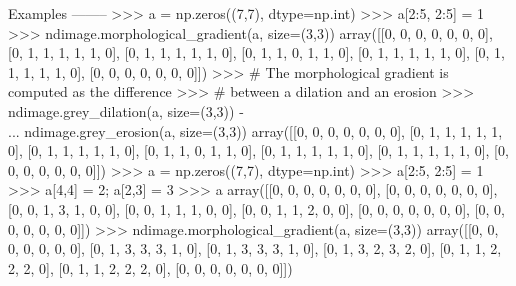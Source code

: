 \begin{DoxyVerb}
Examples
--------
>>> a = np.zeros((7,7), dtype=np.int)
>>> a[2:5, 2:5] = 1
>>> ndimage.morphological_gradient(a, size=(3,3))
array([[0, 0, 0, 0, 0, 0, 0],
       [0, 1, 1, 1, 1, 1, 0],
       [0, 1, 1, 1, 1, 1, 0],
       [0, 1, 1, 0, 1, 1, 0],
       [0, 1, 1, 1, 1, 1, 0],
       [0, 1, 1, 1, 1, 1, 0],
       [0, 0, 0, 0, 0, 0, 0]])
>>> # The morphological gradient is computed as the difference
>>> # between a dilation and an erosion
>>> ndimage.grey_dilation(a, size=(3,3)) -\\
...  ndimage.grey_erosion(a, size=(3,3))
array([[0, 0, 0, 0, 0, 0, 0],
       [0, 1, 1, 1, 1, 1, 0],
       [0, 1, 1, 1, 1, 1, 0],
       [0, 1, 1, 0, 1, 1, 0],
       [0, 1, 1, 1, 1, 1, 0],
       [0, 1, 1, 1, 1, 1, 0],
       [0, 0, 0, 0, 0, 0, 0]])
>>> a = np.zeros((7,7), dtype=np.int)
>>> a[2:5, 2:5] = 1
>>> a[4,4] = 2; a[2,3] = 3
>>> a
array([[0, 0, 0, 0, 0, 0, 0],
       [0, 0, 0, 0, 0, 0, 0],
       [0, 0, 1, 3, 1, 0, 0],
       [0, 0, 1, 1, 1, 0, 0],
       [0, 0, 1, 1, 2, 0, 0],
       [0, 0, 0, 0, 0, 0, 0],
       [0, 0, 0, 0, 0, 0, 0]])
>>> ndimage.morphological_gradient(a, size=(3,3))
array([[0, 0, 0, 0, 0, 0, 0],
       [0, 1, 3, 3, 3, 1, 0],
       [0, 1, 3, 3, 3, 1, 0],
       [0, 1, 3, 2, 3, 2, 0],
       [0, 1, 1, 2, 2, 2, 0],
       [0, 1, 1, 2, 2, 2, 0],
       [0, 0, 0, 0, 0, 0, 0]])\end{DoxyVerb}
 \hypertarget{namespacescipy_1_1ndimage_1_1morphology_a7616378b49db68c1226516a3cab54adf}{}
